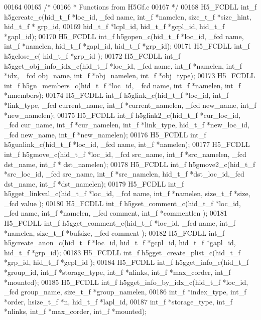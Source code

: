 \begin{DoxyCode}
00164 
00165 \textcolor{comment}{/*}
00166 \textcolor{comment}{ * Functions from H5Gf.c}
00167 \textcolor{comment}{ */}
00168 H5\_FCDLL int\_f h5gcreate\_c(hid\_t\_f *loc\_id, \_fcd name, int\_f *namelen, size\_t\_f *size\_hint,  hid\_t\_f *
      grp\_id,
00169                  hid\_t\_f *lcpl\_id, hid\_t\_f *gcpl\_id, hid\_t\_f *gapl\_id);
00170 H5\_FCDLL int\_f h5gopen\_c(hid\_t\_f *loc\_id, \_fcd name, int\_f *namelen, hid\_t\_f *gapl\_id, hid\_t\_f *grp\_id);
00171 H5\_FCDLL int\_f h5gclose\_c( hid\_t\_f *grp\_id );
00172 H5\_FCDLL int\_f h5gget\_obj\_info\_idx\_c(hid\_t\_f *loc\_id, \_fcd name, int\_f *namelen, int\_f *idx, \_fcd obj\_name,
       int\_f *obj\_namelen, int\_f *obj\_type);
00173 H5\_FCDLL int\_f h5gn\_members\_c(hid\_t\_f *loc\_id, \_fcd name, int\_f *namelen, int\_f *nmembers);
00174 H5\_FCDLL int\_f h5glink\_c(hid\_t\_f *loc\_id, int\_f *link\_type, \_fcd current\_name, int\_f *current\_namelen, \_fcd
       new\_name, int\_f *new\_namelen);
00175 H5\_FCDLL int\_f h5glink2\_c(hid\_t\_f *cur\_loc\_id, \_fcd cur\_name, int\_f *cur\_namelen, int\_f *link\_type, hid\_t\_f
       *new\_loc\_id, \_fcd new\_name, int\_f *new\_namelen);
00176 H5\_FCDLL int\_f h5gunlink\_c(hid\_t\_f *loc\_id, \_fcd name, int\_f *namelen);
00177 H5\_FCDLL int\_f h5gmove\_c(hid\_t\_f *loc\_id, \_fcd src\_name, int\_f *src\_namelen, \_fcd dst\_name, int\_f *
      dst\_namelen);
00178 H5\_FCDLL int\_f h5gmove2\_c(hid\_t\_f *src\_loc\_id, \_fcd src\_name, int\_f *src\_namelen, hid\_t\_f *dst\_loc\_id,\_fcd 
      dst\_name, int\_f *dst\_namelen);
00179 H5\_FCDLL int\_f h5gget\_linkval\_c(hid\_t\_f *loc\_id, \_fcd name, int\_f *namelen, size\_t\_f *size, \_fcd value );
00180 H5\_FCDLL int\_f h5gset\_comment\_c(hid\_t\_f *loc\_id, \_fcd name, int\_f *namelen, \_fcd comment, int\_f *commentlen
      );
00181 H5\_FCDLL int\_f h5gget\_comment\_c(hid\_t\_f *loc\_id, \_fcd name, int\_f *namelen, size\_t\_f *bufsize, \_fcd comment
      );
00182 H5\_FCDLL int\_f h5gcreate\_anon\_c(hid\_t\_f *loc\_id, hid\_t\_f *gcpl\_id, hid\_t\_f *gapl\_id, hid\_t\_f *grp\_id);
00183 H5\_FCDLL int\_f h5gget\_create\_plist\_c(hid\_t\_f *grp\_id, hid\_t\_f *gcpl\_id );
00184 H5\_FCDLL int\_f h5gget\_info\_c(hid\_t\_f *group\_id, int\_f *storage\_type, int\_f *nlinks, int\_f *max\_corder, 
      int\_f *mounted);
00185 H5\_FCDLL int\_f h5gget\_info\_by\_idx\_c(hid\_t\_f *loc\_id, \_fcd group\_name, size\_t\_f *group\_namelen,
00186                      int\_f *index\_type, int\_f *order, hsize\_t\_f *n, hid\_t\_f *lapl\_id,
00187                      int\_f *storage\_type, int\_f *nlinks, int\_f *max\_corder, int\_f *mounted);

\end{DoxyCode}
